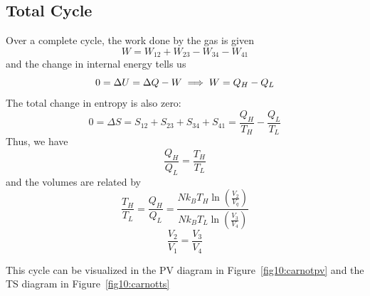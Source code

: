 \subsection{Total Cycle}
Over a complete cycle, the work done by the gas is given
\begin{equation}
	W=W_{12}+W_{23}-W_{34}-W_{41}
\end{equation}
and the change in internal energy tells us
\[0 = \Delta U=\Delta Q-W\implies W=Q_H-Q_L\]
The total change in entropy is also zero:
\[0=\Delta S = S_{12}+S_{23}+S_{34}+S_{41}=\frac{Q_H}{T_H}-\frac{Q_L}{T_L}\]
Thus, we have
\begin{equation}
	\frac{Q_H}{Q_L}=\frac{T_H}{T_L}
\end{equation}
and the volumes are related by
\[\frac{T_H}{T_L}=\frac{Q_H}{Q_L}=\frac{Nk_BT_H\ln\left(\frac{V_2}{V_q}\right)}{Nk_BT_L\ln\left(\frac{V_3}{V_4}\right)}\]
\begin{equation}
	\frac{V_2}{V_1}=\frac{V_3}{V_4}
\end{equation}

This cycle can be visualized in the PV diagram in Figure~\ref{fig10:carnotpv} and the TS diagram in Figure~\ref{fig10:carnotts}

